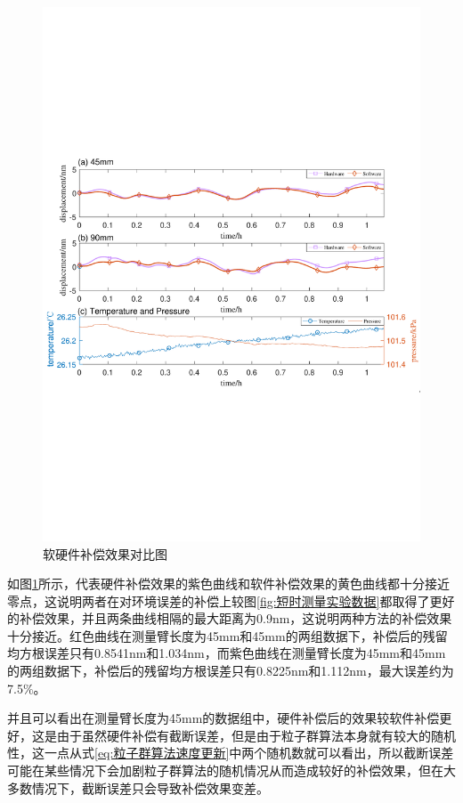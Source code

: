 \begin{figure}[htb]
  \centering
  \includegraphics[width=14cm]{fig/6-fig/软硬件补偿效果对比.pdf}
  \caption{软硬件补偿效果对比图}
  \label{fig:软硬件补偿效果对比图}
\end{figure}
如图\ref{fig:软硬件补偿效果对比图}所示，代表硬件补偿效果的紫色曲线和软件补偿效果的黄色曲线都十分接近零点，这说明两者在对环境误差的补偿上较图\ref{fig:短时测量实验数据}都取得了更好的补偿效果，并且两条曲线相隔的最大距离为0.9nm，这说明两种方法的补偿效果十分接近。红色曲线在测量臂长度为45mm和45mm的两组数据下，补偿后的残留均方根误差只有0.8541nm和1.034nm，而紫色曲线在测量臂长度为45mm和45mm的两组数据下，补偿后的残留均方根误差只有0.8225nm和1.112nm，最大误差约为7.5$\%$。

并且可以看出在测量臂长度为45mm的数据组中，硬件补偿后的效果较软件补偿更好，这是由于虽然硬件补偿有截断误差，但是由于粒子群算法本身就有较大的随机性，这一点从式\eqref{eq:粒子群算法速度更新}中两个随机数就可以看出，所以截断误差可能在某些情况下会加剧粒子群算法的随机情况从而造成较好的补偿效果，但在大多数情况下，截断误差只会导致补偿效果变差。


